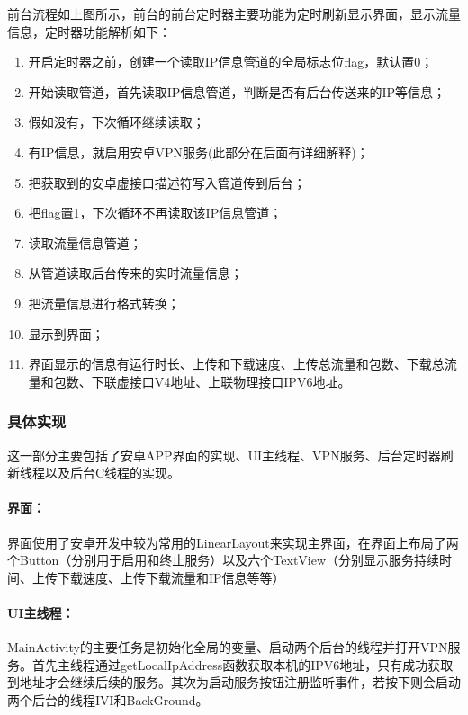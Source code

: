 \documentclass[paper=a4, fontsize=11pt, UTF8]{article} %
\numberwithin{equation}{section} %
\numberwithin{figure}{section} %
\numberwithin{table}{section} %
\begin{document}
\newpage 

前台流程如上图所示，前台的前台定时器主要功能为定时刷新显示界面，显示流量信息，定时器功能解析如下：

\begin{enumerate}
\item 开启定时器之前，创建一个读取IP信息管道的全局标志位flag，默认置0；
\item 开始读取管道，首先读取IP信息管道，判断是否有后台传送来的IP等信息；
\item 假如没有，下次循环继续读取；
\item 有IP信息，就启用安卓VPN服务(此部分在后面有详细解释)；
\item 把获取到的安卓虚接口描述符写入管道传到后台；
\item 把flag置1，下次循环不再读取该IP信息管道；
\item 读取流量信息管道；
\item 从管道读取后台传来的实时流量信息；
\item 把流量信息进行格式转换；
\item 显示到界面；
\item 界面显示的信息有运行时长、上传和下载速度、上传总流量和包数、下载总流量和包数、下联虚接口V4地址、上联物理接口IPV6地址。
\end{enumerate}

\subsubsection{具体实现}

这一部分主要包括了安卓APP界面的实现、UI主线程、VPN服务、后台定时器刷新线程以及后台C线程的实现。

\paragraph{界面：} 界面使用了安卓开发中较为常用的LinearLayout来实现主界面，在界面上布局了两个Button（分别用于启用和终止服务）以及六个TextView（分别显示服务持续时间、上传下载速度、上传下载流量和IP信息等等）

\paragraph{UI主线程：} MainActivity的主要任务是初始化全局的变量、启动两个后台的线程并打开VPN服务。首先主线程通过getLocalIpAddress函数获取本机的IPV6地址，只有成功获取到地址才会继续后续的服务。其次为启动服务按钮注册监听事件，若按下则会启动两个后台的线程IVI和BackGround。
\end{document}
